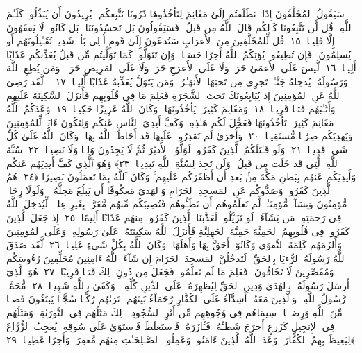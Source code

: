  سَيَقُولُ ٱلمُخَلَّفُونَ إِذَا ٱنطَلَقتُم إِلَىٰ مَغَانِمَ لِتَأخُذُوهَا ذَرُونَا نَتَّبِعكُم ۖ يُرِيدُونَ أَن يُبَدِّلُوا۟ كَلَـٰمَ ٱللَّهِ ۚ قُل لَّن تَتَّبِعُونَا كَذَٟلِكُم قَالَ ٱللَّهُ مِن قَبلُ ۖ فَسَيَقُولُونَ بَل تَحسُدُونَنَا ۚ بَل كَانُوا۟ لَا يَفقَهُونَ إِلَّا قَلِيلًۭا ﴿١٥﴾
 قُل لِّلمُخَلَّفِينَ مِنَ ٱلأَعرَابِ سَتُدعَونَ إِلَىٰ قَومٍ أُو۟لِى بَأسٍۢ شَدِيدٍۢ تُقَـٰتِلُونَهُم أَو يُسلِمُونَ ۖ فَإِن تُطِيعُوا۟ يُؤتِكُمُ ٱللَّهُ أَجرًا حَسَنًۭا ۖ وَإِن تَتَوَلَّوا۟ كَمَا تَوَلَّيتُم مِّن قَبلُ يُعَذِّبكُم عَذَابًا أَلِيمًۭا ﴿١٦﴾
 لَّيسَ عَلَى ٱلأَعمَىٰ حَرَجٌۭ وَلَا عَلَى ٱلأَعرَجِ حَرَجٌۭ وَلَا عَلَى ٱلمَرِيضِ حَرَجٌۭ ۗ وَمَن يُطِعِ ٱللَّهَ وَرَسُولَهُۥ يُدخِلهُ جَنَّـٰتٍۢ تَجرِى مِن تَحتِهَا ٱلأَنهَـٰرُ ۖ وَمَن يَتَوَلَّ يُعَذِّبهُ عَذَابًا أَلِيمًۭا ﴿١٧﴾
 ۞ لَّقَد رَضِىَ ٱللَّهُ عَنِ ٱلمُؤمِنِينَ إِذ يُبَايِعُونَكَ تَحتَ ٱلشَّجَرَةِ فَعَلِمَ مَا فِى قُلُوبِهِم فَأَنزَلَ ٱلسَّكِينَةَ عَلَيهِم وَأَثَـٰبَهُم فَتحًۭا قَرِيبًۭا ﴿١٨﴾
 وَمَغَانِمَ كَثِيرَةًۭ يَأخُذُونَهَا ۗ وَكَانَ ٱللَّهُ عَزِيزًا حَكِيمًۭا ﴿١٩﴾
 وَعَدَكُمُ ٱللَّهُ مَغَانِمَ كَثِيرَةًۭ تَأخُذُونَهَا فَعَجَّلَ لَكُم هَـٰذِهِۦ وَكَفَّ أَيدِىَ ٱلنَّاسِ عَنكُم وَلِتَكُونَ ءَايَةًۭ لِّلمُؤمِنِينَ وَيَهدِيَكُم صِرَٰطًۭا مُّستَقِيمًۭا ﴿٢٠﴾
 وَأُخرَىٰ لَم تَقدِرُوا۟ عَلَيهَا قَد أَحَاطَ ٱللَّهُ بِهَا ۚ وَكَانَ ٱللَّهُ عَلَىٰ كُلِّ شَىءٍۢ قَدِيرًۭا ﴿٢١﴾
 وَلَو قَـٰتَلَكُمُ ٱلَّذِينَ كَفَرُوا۟ لَوَلَّوُا۟ ٱلأَدبَٰرَ ثُمَّ لَا يَجِدُونَ وَلِيًّۭا وَلَا نَصِيرًۭا ﴿٢٢﴾
 سُنَّةَ ٱللَّهِ ٱلَّتِى قَد خَلَت مِن قَبلُ ۖ وَلَن تَجِدَ لِسُنَّةِ ٱللَّهِ تَبدِيلًۭا ﴿٢٣﴾
 وَهُوَ ٱلَّذِى كَفَّ أَيدِيَهُم عَنكُم وَأَيدِيَكُم عَنهُم بِبَطنِ مَكَّةَ مِنۢ بَعدِ أَن أَظفَرَكُم عَلَيهِم ۚ وَكَانَ ٱللَّهُ بِمَا تَعمَلُونَ بَصِيرًا ﴿٢٤﴾
 هُمُ ٱلَّذِينَ كَفَرُوا۟ وَصَدُّوكُم عَنِ ٱلمَسجِدِ ٱلحَرَامِ وَٱلهَدىَ مَعكُوفًا أَن يَبلُغَ مَحِلَّهُۥ ۚ وَلَولَا رِجَالٌۭ مُّؤمِنُونَ وَنِسَآءٌۭ مُّؤمِنَـٰتٌۭ لَّم تَعلَمُوهُم أَن تَطَـُٔوهُم فَتُصِيبَكُم مِّنهُم مَّعَرَّةٌۢ بِغَيرِ عِلمٍۢ ۖ لِّيُدخِلَ ٱللَّهُ فِى رَحمَتِهِۦ مَن يَشَآءُ ۚ لَو تَزَيَّلُوا۟ لَعَذَّبنَا ٱلَّذِينَ كَفَرُوا۟ مِنهُم عَذَابًا أَلِيمًا ﴿٢٥﴾
 إِذ جَعَلَ ٱلَّذِينَ كَفَرُوا۟ فِى قُلُوبِهِمُ ٱلحَمِيَّةَ حَمِيَّةَ ٱلجَٰهِلِيَّةِ فَأَنزَلَ ٱللَّهُ سَكِينَتَهُۥ عَلَىٰ رَسُولِهِۦ وَعَلَى ٱلمُؤمِنِينَ وَأَلزَمَهُم كَلِمَةَ ٱلتَّقوَىٰ وَكَانُوٓا۟ أَحَقَّ بِهَا وَأَهلَهَا ۚ وَكَانَ ٱللَّهُ بِكُلِّ شَىءٍ عَلِيمًۭا ﴿٢٦﴾
 لَّقَد صَدَقَ ٱللَّهُ رَسُولَهُ ٱلرُّءيَا بِٱلحَقِّ ۖ لَتَدخُلُنَّ ٱلمَسجِدَ ٱلحَرَامَ إِن شَآءَ ٱللَّهُ ءَامِنِينَ مُحَلِّقِينَ رُءُوسَكُم وَمُقَصِّرِينَ لَا تَخَافُونَ ۖ فَعَلِمَ مَا لَم تَعلَمُوا۟ فَجَعَلَ مِن دُونِ ذَٟلِكَ فَتحًۭا قَرِيبًا ﴿٢٧﴾
 هُوَ ٱلَّذِىٓ أَرسَلَ رَسُولَهُۥ بِٱلهُدَىٰ وَدِينِ ٱلحَقِّ لِيُظهِرَهُۥ عَلَى ٱلدِّينِ كُلِّهِۦ ۚ وَكَفَىٰ بِٱللَّهِ شَهِيدًۭا ﴿٢٨﴾
 مُّحَمَّدٌۭ رَّسُولُ ٱللَّهِ ۚ وَٱلَّذِينَ مَعَهُۥٓ أَشِدَّآءُ عَلَى ٱلكُفَّارِ رُحَمَآءُ بَينَهُم ۖ تَرَىٰهُم رُكَّعًۭا سُجَّدًۭا يَبتَغُونَ فَضلًۭا مِّنَ ٱللَّهِ وَرِضوَٟنًۭا ۖ سِيمَاهُم فِى وُجُوهِهِم مِّن أَثَرِ ٱلسُّجُودِ ۚ ذَٟلِكَ مَثَلُهُم فِى ٱلتَّورَىٰةِ ۚ وَمَثَلُهُم فِى ٱلإِنجِيلِ كَزَرعٍ أَخرَجَ شَطـَٔهُۥ فَـَٔازَرَهُۥ فَٱستَغلَظَ فَٱستَوَىٰ عَلَىٰ سُوقِهِۦ يُعجِبُ ٱلزُّرَّاعَ لِيَغِيظَ بِهِمُ ٱلكُفَّارَ ۗ وَعَدَ ٱللَّهُ ٱلَّذِينَ ءَامَنُوا۟ وَعَمِلُوا۟ ٱلصَّـٰلِحَـٰتِ مِنهُم مَّغفِرَةًۭ وَأَجرًا عَظِيمًۢا ﴿٢٩﴾
 
